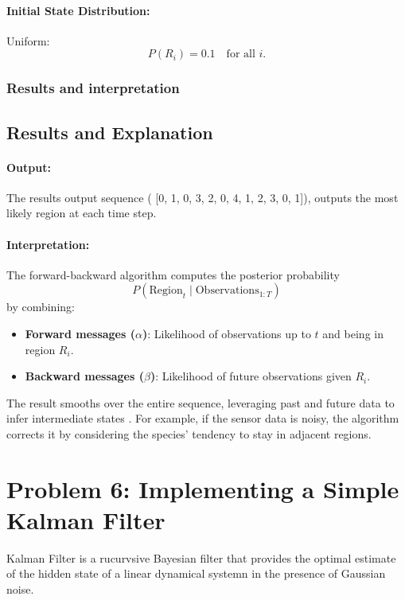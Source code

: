 \documentclass{article}
\begin{document}
\paragraph{Initial State Distribution:}
Uniform:
\[
P(R_i) = 0.1 \quad \text{for all } i.
\]


\subsubsection*{Results and interpretation}

\subsection*{Results and Explanation}

\paragraph{Output:}
The results output sequence ( [0, 1, 0, 3, 2, 0, 4, 1, 2, 3, 0, 1]), outputs the most likely region at each time step.

\paragraph{Interpretation:}
The forward-backward algorithm computes the posterior probability 
\[
P(\text{Region}_t \mid \text{Observations}_{1:T})
\]
by combining:

\begin{itemize}
    \item \textbf{Forward messages (\(\alpha\))}: Likelihood of observations up to \(t\) and being in region \(R_i\).
    \item \textbf{Backward messages (\(\beta\))}: Likelihood of future observations given \(R_i\).
\end{itemize}

The result smooths over the entire sequence, leveraging past and future data to infer intermediate states
. For example, if the sensor data is noisy, the algorithm corrects it by considering the species’ tendency to stay in adjacent regions.


\clearpage

\section*{Problem 6: Implementing a Simple Kalman Filter}
Kalman Filter is a rucurvsive Bayesian filter that provides the optimal estimate of the hidden state of a linear dynamical systemn in the presence of Gaussian noise.
\end{document}
